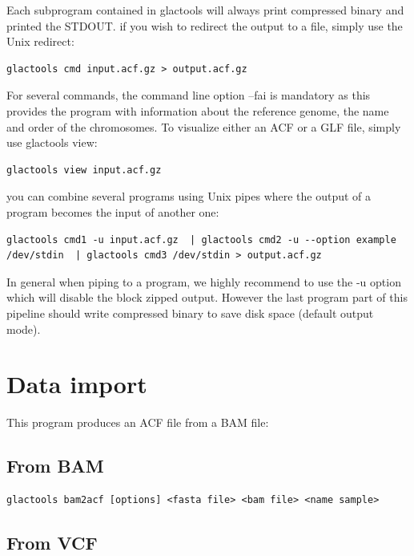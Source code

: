 \documentclass[a4paper]{article}
\begin{document}
Each subprogram contained in glactools will always print compressed binary and printed the STDOUT.  if you wish to redirect the output to a file, simply use the Unix redirect:

\begin{lstlisting}
glactools cmd input.acf.gz > output.acf.gz 
\end{lstlisting}

\noindent  For several commands, the command line option --fai is mandatory as this provides the program with information about the reference genome, the name  and order of the chromosomes. To visualize either an ACF or a GLF file,  simply use glactools view:


\begin{lstlisting}
glactools view input.acf.gz 
\end{lstlisting}

\noindent you can combine several programs using Unix pipes where the output of a program becomes the input of another one:

\begin{lstlisting}
glactools cmd1 -u input.acf.gz  | glactools cmd2 -u --option example /dev/stdin  | glactools cmd3 /dev/stdin > output.acf.gz
\end{lstlisting}

\noindent In general when piping to a program, we highly recommend to use the -u option which will disable the block zipped output.  However the last program part of this pipeline should write compressed binary to save disk space (default output mode). 

\newpage
\section{Data import}

\noindent This program produces an ACF file from a BAM file:

\subsection{From BAM}

\small
\begin{lstlisting} 
glactools bam2acf [options] <fasta file> <bam file> <name sample> 
\end{lstlisting} 
\normalsize


\subsection{From VCF}
\end{document}
